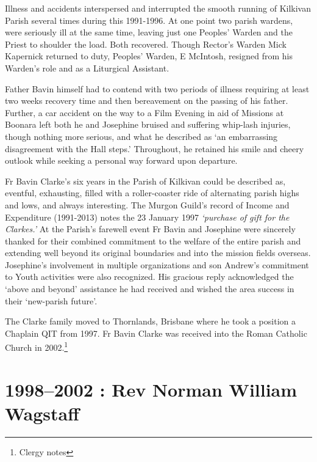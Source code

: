 Illness and accidents interspersed and interrupted the smooth running of Kilkivan Parish several times during this 1991-1996. At one point two parish wardens, were seriously ill at the same time, leaving just one Peoples' Warden and the Priest to shoulder the load. Both recovered. Though Rector's Warden Mick Kapernick returned to duty, Peoples' Warden, E McIntosh, resigned from his Warden's role and as a Liturgical Assistant.



Father Bavin himself had to contend with two periods of illness requiring at least two weeks recovery time and then bereavement on the passing of his father. Further, a car accident on the way to a Film Evening in aid of Missions at Boonara left both he and Josephine bruised and suffering whip-lash injuries, though nothing more serious, and what he described as `an embarrassing disagreement with the Hall steps.' Throughout, he retained his smile and cheery outlook while seeking a personal way forward upon departure.



Fr Bavin Clarke's six years in the Parish of Kilkivan could be described as, eventful, exhausting, filled with a roller-coaster ride of alternating parish highs and lows, and always interesting. The Murgon Guild's record of Income and Expenditure (1991-2013) notes the 23 January 1997 \emph{`purchase of gift for the Clarkes.'} At the Parish's farewell event Fr Bavin and Josephine were sincerely thanked for their combined commitment to the welfare of the entire parish and extending well beyond its original boundaries and into the mission fields overseas. Josephine's involvement in multiple organizations and son Andrew's commitment to Youth activities were also recognized. His gracious reply acknowledged the `above and beyond' assistance he had received and wished the area success in their `new-parish future'.



The Clarke family moved to Thornlands, Brisbane where he took a position a Chaplain QIT from 1997. Fr Bavin Clarke was received into the Roman Catholic Church in 2002.\footnote{Clergy notes}


\section{1998--2002 : Rev Norman William Wagstaff}









